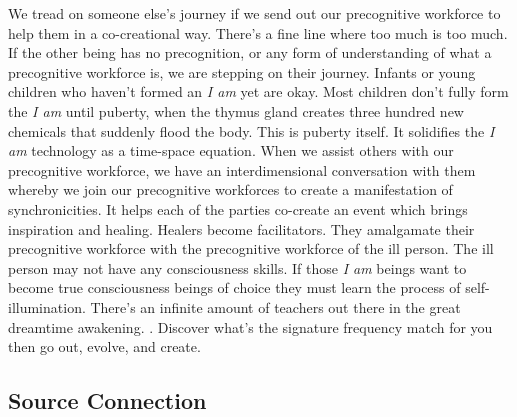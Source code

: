 We tread on someone else's journey if we send out our precognitive
workforce to help them in a co-creational way. There's a fine line where
too much is too much. If the other being has no precognition, or any
form of understanding of what a precognitive workforce is, we are
stepping on their journey. Infants or young children who haven't formed
an \emph{I am} yet are okay. Most children don't fully form the \emph{I
am} until puberty, when the thymus gland creates three hundred new
chemicals that suddenly flood the body. This is puberty itself. It
solidifies the \emph{I am} technology as a time-space equation. When we
assist others with our precognitive workforce, we have an
interdimensional conversation with them whereby we join our precognitive
workforces to create a manifestation of synchronicities. It helps each
of the parties co-create an event which brings inspiration and healing.
Healers become facilitators. They amalgamate their precognitive
workforce with the precognitive workforce of the ill person. The ill
person may not have any consciousness skills. If those \emph{I am}
beings want to become true consciousness beings of choice they must
learn the process of self-illumination. There's an infinite amount of
teachers out there in the great dreamtime awakening. . Discover what's
the signature frequency match for you then go out, evolve, and create.

\subsection{Source Connection}\label{source-connection}


